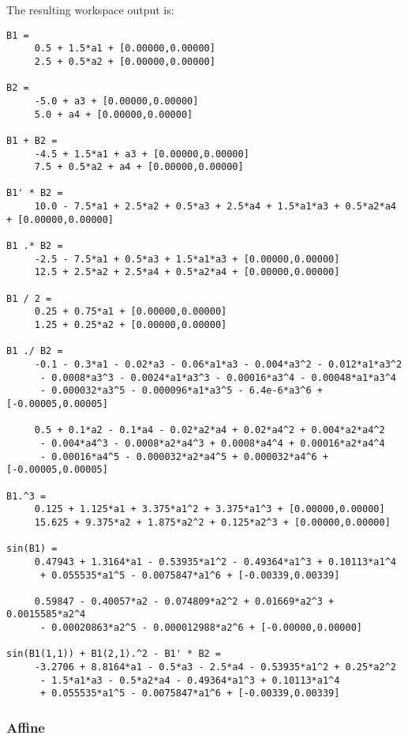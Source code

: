 {\small
}

The resulting workspace output is:
\footnotesize
\begin{Verbatim}
B1 = 
 	 0.5 + 1.5*a1 + [0.00000,0.00000]
 	 2.5 + 0.5*a2 + [0.00000,0.00000]

B2 = 
 	 -5.0 + a3 + [0.00000,0.00000]
 	 5.0 + a4 + [0.00000,0.00000]

B1 + B2 = 
 	 -4.5 + 1.5*a1 + a3 + [0.00000,0.00000]
 	 7.5 + 0.5*a2 + a4 + [0.00000,0.00000]

B1' * B2 = 
 	 10.0 - 7.5*a1 + 2.5*a2 + 0.5*a3 + 2.5*a4 + 1.5*a1*a3 + 0.5*a2*a4 + [0.00000,0.00000]

B1 .* B2 = 
 	 -2.5 - 7.5*a1 + 0.5*a3 + 1.5*a1*a3 + [0.00000,0.00000]
 	 12.5 + 2.5*a2 + 2.5*a4 + 0.5*a2*a4 + [0.00000,0.00000]

B1 / 2 = 
 	 0.25 + 0.75*a1 + [0.00000,0.00000]
 	 1.25 + 0.25*a2 + [0.00000,0.00000]

B1 ./ B2 = 
 	 -0.1 - 0.3*a1 - 0.02*a3 - 0.06*a1*a3 - 0.004*a3^2 - 0.012*a1*a3^2 
	  - 0.0008*a3^3 - 0.0024*a1*a3^3 - 0.00016*a3^4 - 0.00048*a1*a3^4 
	  - 0.000032*a3^5 - 0.000096*a1*a3^5 - 6.4e-6*a3^6 + [-0.00005,0.00005]
	  
 	 0.5 + 0.1*a2 - 0.1*a4 - 0.02*a2*a4 + 0.02*a4^2 + 0.004*a2*a4^2 
	  - 0.004*a4^3 - 0.0008*a2*a4^3 + 0.0008*a4^4 + 0.00016*a2*a4^4 
	  - 0.00016*a4^5 - 0.000032*a2*a4^5 + 0.000032*a4^6 + [-0.00005,0.00005]

B1.^3 = 
 	 0.125 + 1.125*a1 + 3.375*a1^2 + 3.375*a1^3 + [0.00000,0.00000]
 	 15.625 + 9.375*a2 + 1.875*a2^2 + 0.125*a2^3 + [0.00000,0.00000]

sin(B1) = 
 	 0.47943 + 1.3164*a1 - 0.53935*a1^2 - 0.49364*a1^3 + 0.10113*a1^4 
	  + 0.055535*a1^5 - 0.0075847*a1^6 + [-0.00339,0.00339]
	  
 	 0.59847 - 0.40057*a2 - 0.074809*a2^2 + 0.01669*a2^3 + 0.0015585*a2^4 
	  - 0.00020863*a2^5 - 0.000012988*a2^6 + [-0.00000,0.00000]

sin(B1(1,1)) + B1(2,1).^2 - B1' * B2 = 
 	 -3.2706 + 8.8164*a1 - 0.5*a3 - 2.5*a4 - 0.53935*a1^2 + 0.25*a2^2 
	  - 1.5*a1*a3 - 0.5*a2*a4 - 0.49364*a1^3 + 0.10113*a1^4 
	  + 0.055535*a1^5 - 0.0075847*a1^6 + [-0.00339,0.00339]
\end{Verbatim}
\normalsize





\subsubsection{Affine}	\label{sec:affineExample}

